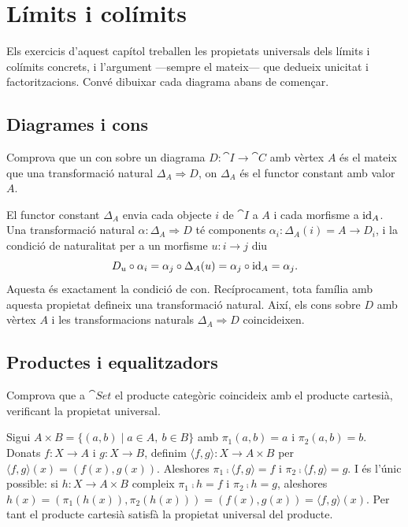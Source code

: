 \chapter[Límits i colímits]{Límits i colímits}

Els exercicis d'aquest capítol treballen les propietats universals dels límits i colímits concrets, i l'argument ---sempre el mateix--- que dedueix unicitat i factoritzacions. Convé dibuixar cada diagrama abans de començar.

\section{Diagrames i cons}

\begin{exercici}
Comprova que un con sobre un diagrama $D\colon\cat{I}\to\cat{C}$ amb vèrtex $A$ és el mateix que una transformació natural $\Delta_A\Rightarrow D$, on $\Delta_A$ és el functor constant amb valor $A$.
\end{exercici}

\begin{solucio}
El functor constant $\Delta_A$ envia cada objecte $i$ de $\cat{I}$ a $A$ i cada morfisme a $\operatorname{id}_A$. Una transformació natural $\alpha\colon\Delta_A\Rightarrow D$ té components $\alpha_i\colon\Delta_A(i)=A\to D_i$, i la condició de naturalitat per a un morfisme $u\colon i\to j$ diu
\[
D_u\circ\alpha_i=\alpha_j\circ\Delta_A(u)=\alpha_j\circ\operatorname{id}_A=\alpha_j.
\]
Aquesta és exactament la condició de con. Recíprocament, tota família amb aquesta propietat defineix una transformació natural. Així, els cons sobre $D$ amb vèrtex $A$ i les transformacions naturals $\Delta_A\Rightarrow D$ coincideixen.
\end{solucio}

\section{Productes i equalitzadors}

\begin{exercici}
Comprova que a $\cat{Set}$ el producte categòric coincideix amb el producte cartesià, verificant la propietat universal.
\end{exercici}

\begin{solucio}
Sigui $A\times B=\{(a,b)\mid a\in A,\ b\in B\}$ amb $\pi_1(a,b)=a$ i $\pi_2(a,b)=b$. Donats $f\colon X\to A$ i $g\colon X\to B$, definim $\langle f,g\rangle\colon X\to A\times B$ per $\langle f,g\rangle(x)=(f(x),g(x))$. Aleshores $\pi_1\comp\langle f,g\rangle=f$ i $\pi_2\comp\langle f,g\rangle=g$. I és l'únic possible: si $h\colon X\to A\times B$ compleix $\pi_1\comp h=f$ i $\pi_2\comp h=g$, aleshores $h(x)=(\pi_1(h(x)),\pi_2(h(x)))=(f(x),g(x))=\langle f,g\rangle(x)$. Per tant el producte cartesià satisfà la propietat universal del producte.
\end{solucio}


